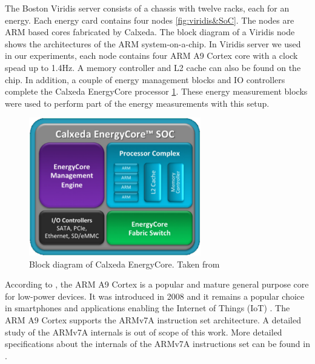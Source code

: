 \vspace{15mm}


The Boston Viridis server consists of a chassis with twelve racks, each for an
energy. Each energy card contains four nodes \ref{fig:viridis&SoC}. 
The nodes are ARM based cores
fabricated by Calxeda. The block diagram of a Viridis node shows the
architectures of the ARM system-on-a-chip. In Viridis server we used in our
experiments, each node contains four ARM A9 Cortex core with a clock spead up
to 1.4Hz. A memory controller and L2 cache can also be found on the chip. In
addition, a couple of energy management blocks and IO controllers complete the
Calxeda EnergyCore processor \ref{fig:calxedaSOC}. These energy measurement
blocks were used to perform part of the energy measurements with this setup.


\vspace{15mm}

\begin{figure}[h!]
  \centering
    \includegraphics[width=75mm]{"img/calxedaSOC"}
    \caption{Block diagram of Calxeda EnergyCore. Taken from \cite{VIRIDIS}}
    \label{fig:calxedaSOC}
\end{figure}


\vspace{15mm}

According to \cite{CORTEXA9}, the ARM A9 Cortex is a popular and mature general
purpose core for low-power devices. It was introduced in 2008 and it remains a
popular choice in smartphones and applications enabling the Internet of Things
(IoT) \cite{CORTEXA9}. The ARM A9 Cortex supports the ARMv7A 
instruction set architecture. A detailed study of the ARMv7A internals is out
of scope of this work. More detailed specifications about the
internals of the ARMv7A instructions set can be found in \cite{CORTEXA9}.


\vspace{15mm}

